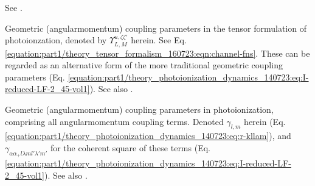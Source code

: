 \documentclass[letterpaper,table,10pt,english]{jupyterBook}
\begin{document}
\begin{description}
\sphinxAtStartPar
See {\hyperref[\detokenize{backmatter/glossary:term-partial-wave-expansion}]{}}.

\sphinxAtStartPar
Geometric (angular\sphinxhyphen{}momentum) coupling parameters in the tensor formulation of photoionzation, denoted by \(\varUpsilon_{L,M}^{u,\zeta\zeta'}\) herein. See Eq. \eqref{equation:part1/theory_tensor_formalism_160723:eqn:channel-fns}. These can be regarded as an alternative form of the more traditional geometric coupling parameters (Eq. \eqref{equation:part1/theory_photoionization_dynamics_140723:eq:I-reduced-LF-2_45-vol1}). See also {\hyperref[\detokenize{backmatter/glossary:term-geometric-coupling-parameters}]{}}.

\sphinxAtStartPar
Geometric (angular\sphinxhyphen{}momentum) coupling parameters in photoionization, comprising all angular\sphinxhyphen{}momentum coupling terms. Denoted \(\gamma_{l,m}\) herein (Eq. \eqref{equation:part1/theory_photoionization_dynamics_140723:eq:r-kllam}), and \(\gamma_{\alpha\alpha_{+}l\lambda ml'\lambda'm'}\) for the coherent square of these terms (Eq. \eqref{equation:part1/theory_photoionization_dynamics_140723:eq:I-reduced-LF-2_45-vol1}). See also {\hyperref[\detokenize{backmatter/glossary:term-channel-functions}]{}}.


\end{description}
\end{document}
